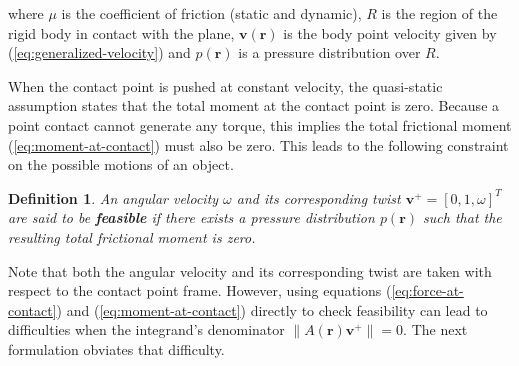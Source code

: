 \documentclass[conference]{IEEEtran}
\newtheorem{definition}{Definition}
\begin{document}
where $\mu$ is the coefficient of friction (static and dynamic), $R$
is the region of the rigid body in contact with the plane,
$\mathbf{v}(\mathbf{r})$ is the body point velocity given by
(\ref{eq:generalized-velocity}) and $p(\mathbf{r})$ is a pressure
distribution over $R$.

When the contact point is pushed at constant velocity, the
quasi-static assumption states that the total moment at the contact
point is zero. Because a point contact cannot generate any torque,
this implies the total frictional moment (\ref{eq:moment-at-contact})
must also be zero. This leads to the following constraint on the
possible motions of an object.
\begin{definition}
  An angular velocity $\omega$ and its corresponding twist
  $\mathbf{v}^+ = [0,1,\omega]^T$ are said to be \textbf{feasible} if
  there exists a pressure distribution $p(\mathbf{r})$ such that the
  resulting total frictional moment is zero.
\end{definition} 
Note that both the angular velocity and its corresponding twist are
taken with respect to the contact point frame. However, using
equations (\ref{eq:force-at-contact}) and (\ref{eq:moment-at-contact})
directly to check feasibility can lead to difficulties when the
integrand's denominator $\lVert A(\mathbf{r})\mathbf{v}^+\rVert =
0$. The next formulation obviates that difficulty.
\end{document}
